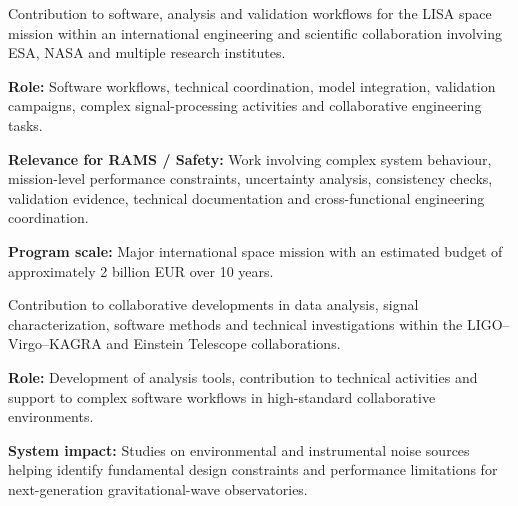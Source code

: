 \documentclass[8pt,a4paper,ragged2e,withhyper]{altacv}
\begin{document}


Contribution to software, analysis and validation workflows for the LISA space mission within an international engineering and scientific collaboration involving ESA, NASA and multiple research institutes.

\textbf{Role:} Software workflows, technical coordination, model integration, validation campaigns, complex signal-processing activities and collaborative engineering tasks.

\textbf{Relevance for RAMS / Safety:} Work involving complex system behaviour, mission-level performance constraints, uncertainty analysis, consistency checks, validation evidence, technical documentation and cross-functional engineering coordination.

\textbf{Program scale:} Major international space mission with an estimated budget of approximately 2 billion EUR over 10 years.

\divider


Contribution to collaborative developments in data analysis, signal characterization, software methods and technical investigations within the LIGO--Virgo--KAGRA and Einstein Telescope collaborations.

\textbf{Role:} Development of analysis tools, contribution to technical activities and support to complex software workflows in high-standard collaborative environments.

\textbf{System impact:} Studies on environmental and instrumental noise sources helping identify fundamental design constraints and performance limitations for next-generation gravitational-wave observatories.


\vspace{-.3cm}


{\small
{}
}
\end{document}
